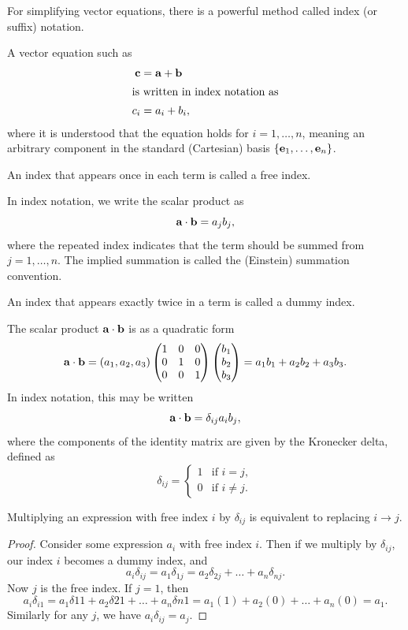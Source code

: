 \documentclass[10pt, a4paper]{article}
\begin{document}
For simplifying vector equations,
there is a powerful method called index
(or suffix)
notation.

A vector equation such as
\begin{align*}
    \mathbf{c} &= \mathbf{a} + \mathbf{b} \\
    \intertext{is written in index notation as}
    c_i &= a_i + b_i,
\end{align*}
where it is understood that the equation holds for $i = 1, \dotsc, n$,
meaning an arbitrary component in the standard
(Cartesian)
basis $\{\mathbf{e}_1, \dotsc, \mathbf{e}_n\}$.

\begin{definition}
    An index that appears once in each term is called a free index.
\end{definition}

In index notation,
we write the scalar product as
\[
\mathbf{a} \cdot \mathbf{b} = a_jb_j,
\]
where the repeated index indicates that the term should be summed from $j = 1, \dotsc, n$.
The implied summation is called the
(Einstein)
summation convention.

\begin{definition}
    An index that appears exactly twice in a term is called a dummy index.
\end{definition}

The scalar product $\mathbf{a} \cdot \mathbf{b}$ is as a quadratic form
\[
\mathbf{a} \cdot \mathbf{b} = (a_1, a_2, a_3)\begin{pmatrix}
    1 & 0 & 0 \\ 0 & 1 & 0 \\ 0 & 0 & 1
\end{pmatrix}\begin{pmatrix}
    b_1 \\ b_2 \\ b_3
\end{pmatrix} = a_1b_1 + a_2b_2 + a_3b_3.
\]
In index notation,
this may be written
\[
\mathbf{a} \cdot \mathbf{b} = \delta_{ij}a_ib_j,
\]
where the components of the identity matrix are given by the Kronecker delta,
defined as
\[
\delta_{ij} = \begin{cases}
    1 &\text{if } i = j, \\
    0 &\text{if } i \neq j.
\end{cases}
\]

\begin{proposition}
    Multiplying an expression with free index $i$ by $\delta_{ij}$ is equivalent to replacing $i \to j$.

    \begin{proof}
        Consider some expression $a_i$ with free index $i$.
        Then if we multiply by $\delta_{ij}$,
        our index $i$ becomes a dummy index,
        and
        \[
        a_i\delta_{ij} = a_1\delta_{1j} = a_2\delta_{2j} + \dotsc + a_n\delta_{nj}.
        \]
        Now $j$ is the free index.
        If $j = 1$,
        then
        \[
        a_i\delta_{i1} = a_1\delta{11} + a_2\delta{21} + \dotsc + a_n\delta{n1} = a_1(1) + a_2(0) + \dotsc + a_n(0) = a_1.
        \]
        Similarly for any $j$,
        we have $a_i\delta_{ij} = a_j$.
    \end{proof}
\end{proposition}
\end{document}
